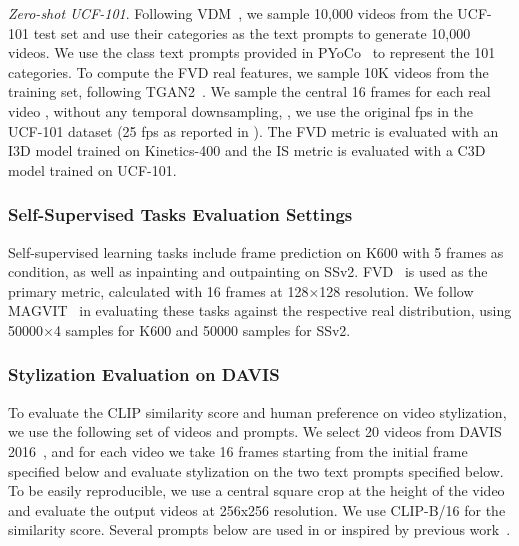\emph{Zero-shot UCF-101}.
Following VDM~\cite{ho2022video}, we sample 10,000 videos from the UCF-101 test set and use their categories as the text prompts to generate 10,000 videos.
We use the class text prompts provided in PYoCo~\cite{ge2023preserve} to represent the 101 categories.
To compute the FVD real features, we sample 10K videos from the training set, following TGAN2~\cite{saito2020train}.
We sample the central 16 frames for each real video , without any temporal downsampling, \ie, we use the original fps in the UCF-101 dataset (25 fps as reported in \cite{soomro2012ucf101}).
The FVD metric is evaluated with an I3D model trained on Kinetics-400 and the IS metric is evaluated with a C3D model trained on UCF-101.

\subsubsection{Self-Supervised Tasks Evaluation Settings}
\label{sec:ssl_task}
Self-supervised learning tasks include frame prediction on K600 with 5 frames as condition, as well as inpainting and outpainting on SSv2.
FVD~\cite{unterthiner2018towards} is used as the primary metric, calculated with 16 frames at 128$\times$128 resolution.
We follow MAGVIT~\cite{yu2023magvit} in evaluating these tasks against the respective real distribution, using 50000$\times$4 samples for K600 and 50000 samples for SSv2.




\subsubsection{Stylization Evaluation on DAVIS} \label{sec:appendix-stylization-davis}

To evaluate the CLIP similarity score and human preference on video stylization, we use the following set of videos and prompts. We select 20 videos from DAVIS 2016~\cite{Perazzi2016davis}, and for each video we take 16 frames starting from the initial frame specified below and evaluate stylization on the two text prompts specified below. To be easily reproducible, we use a central square crop at the height of the video and evaluate the output videos at 256x256 resolution. We use CLIP-B/16 for the similarity score. Several prompts below are used in or inspired by previous work~\cite{esser2023structure,chen2023control,liew2023magicedit}.

